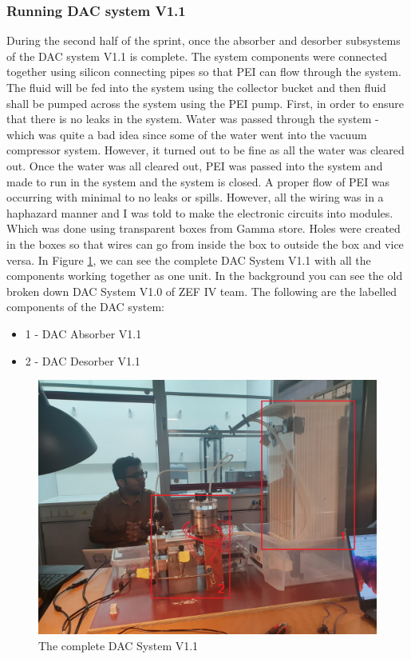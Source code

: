 \subsubsection{Running DAC system V1.1}

During the second half of the sprint, once the absorber and desorber subsystems of the DAC system V1.1 is complete. The system components were connected together using silicon connecting pipes so that PEI can flow through the system. The fluid will be fed into the system using the collector bucket and then fluid shall be pumped across the system using the PEI pump. 
\bigbreak
First, in order to ensure that there is no leaks in the system. Water was passed through the system - which was quite a bad idea since some of the water went into the vacuum compressor system. However, it turned out to be fine as all the water was cleared out. Once the water was all cleared out, PEI was passed into the system and made to run in the system and the system is closed. A proper flow of PEI was occurring with minimal to no leaks or spills. However, all the wiring was in a haphazard manner and I was told to make the electronic circuits into modules. Which was done using transparent boxes from Gamma store. Holes were created in the boxes so that wires can go from inside the box to outside the box and vice versa.
\bigbreak 
In Figure \ref{fig:dacsystem1.1}, we can see the complete DAC System V1.1 with all the components working together as one unit. In the background you can see the old broken down DAC System V1.0 of ZEF IV team. The following are the labelled components of the DAC system: 

\begin{itemize}
    \item 1 - DAC Absorber V1.1 
    \item 2 - DAC Desorber V1.1 
\end{itemize}

\begin{figure}[H]
    \centering
    \includegraphics[scale = 0.45]{images/mywork/Sprint2/dacsystem1.png}
    \caption{The complete DAC System V1.1 }
    \label{fig:dacsystem1.1}
\end{figure}


